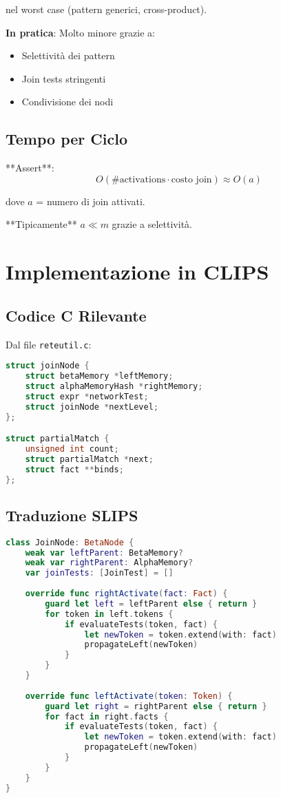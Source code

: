 nel worst case (pattern generici, cross-product).

\textbf{In pratica}: Molto minore grazie a:
\begin{itemize}
\item Selettività dei pattern
\item Join tests stringenti
\item Condivisione dei nodi
\end{itemize}

\subsection{Tempo per Ciclo}

**Assert**:
\begin{equation}
O(\text{\# activations} \cdot \text{costo join}) \approx O(a)
\end{equation}

dove $a$ = numero di join attivati.

**Tipicamente** $a \ll m$ grazie a selettività.

\section{Implementazione in CLIPS}

\subsection{Codice C Rilevante}

Dal file \texttt{reteutil.c}:

\begin{lstlisting}[language=C]
struct joinNode {
    struct betaMemory *leftMemory;
    struct alphaMemoryHash *rightMemory;
    struct expr *networkTest;
    struct joinNode *nextLevel;
};

struct partialMatch {
    unsigned int count;
    struct partialMatch *next;
    struct fact **binds;
};
\end{lstlisting}

\subsection{Traduzione SLIPS}

\begin{lstlisting}[language=Swift]
class JoinNode: BetaNode {
    weak var leftParent: BetaMemory?
    weak var rightParent: AlphaMemory?
    var joinTests: [JoinTest] = []
    
    override func rightActivate(fact: Fact) {
        guard let left = leftParent else { return }
        for token in left.tokens {
            if evaluateTests(token, fact) {
                let newToken = token.extend(with: fact)
                propagateLeft(newToken)
            }
        }
    }
    
    override func leftActivate(token: Token) {
        guard let right = rightParent else { return }
        for fact in right.facts {
            if evaluateTests(token, fact) {
                let newToken = token.extend(with: fact)
                propagateLeft(newToken)
            }
        }
    }
}
\end{lstlisting}

